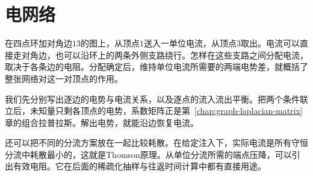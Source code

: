 \chapter{电网络}
\label{chap:graph-electrical-networks}

在四点环加对角边$13$的图上，从顶点$1$送入一单位电流，从顶点$3$取出。电流可以直接走对角边，也可以沿环上的两条外侧支路绕行。怎样在这些支路之间分配电流，取决于各条边的电阻。分配确定后，维持单位电流所需要的两端电势差，就概括了整张网络对这一对顶点的作用。

我们先分别写出逐边的电势与电流关系，以及逐点的流入流出平衡。把两个条件联立后，未知量只剩各顶点的电势，系数矩阵正是第~\ref{chap:graph-laplacian-matrix}章的组合拉普拉斯。解出电势，就能沿边恢复电流。

还可以把不同的分流方案放在一起比较耗散。在给定注入下，实际电流是所有守恒分流中耗散最小的，这就是Thomson原理。从单位分流所需的端点压降，可以引出有效电阻。它在后面的稀疏化抽样与往返时间计算中都有直接用途。






